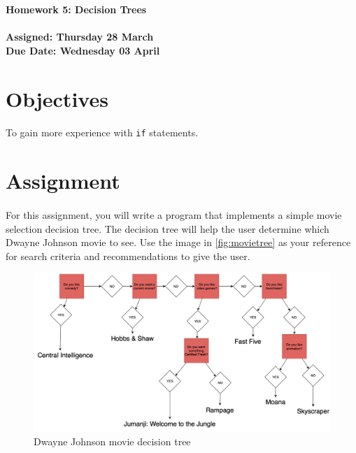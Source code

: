\documentclass[letter,11pt]{article}
\begin{document}
\huge
\textbf{Homework 5: Decision Trees}
\normalsize
\\ ~~ \\
\textbf{Assigned: Thursday 28 March} \\
\textbf{Due Date: Wednesday 03 April}

\section*{Objectives}
\paragraph{}To gain more experience with \texttt{if} statements.

\FloatBarrier
\section*{Assignment}
\paragraph{}For this assignment, you will write a program that implements a simple movie selection decision tree. The decision tree will help the user determine which Dwayne Johnson movie to see. Use the image in \autoref{fig:movietree} as your reference for search criteria and recommendations to give the user.

\begin{figure}[h!]
    \centering
    \includegraphics[scale=0.41]{Homework/Homework 05 - Dwayne Johnson Movie Decision Tree.png}
    \caption{Dwayne Johnson movie decision tree}
    \label{fig:movietree}
\end{figure}
\end{document}
